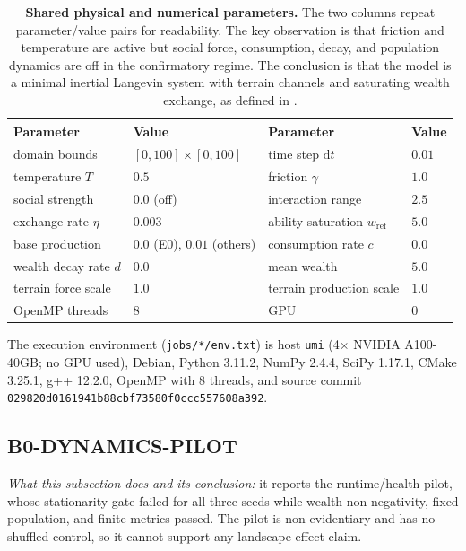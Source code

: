 \documentclass[11pt,a4paper]{article}
\newcommand{\code}[1]{\texttt{#1}}
\begin{document}
\begin{table}[htbp]
\centering
\small
\begin{tabular}{@{}llll@{}}
\toprule
\textbf{Parameter} & \textbf{Value} & \textbf{Parameter} & \textbf{Value} \\
\midrule
domain bounds & $[0,100]\times[0,100]$ & time step $\mathrm{d}t$ & $0.01$ \\
temperature $T$ & $0.5$ & friction $\gamma$ & $1.0$ \\
social strength & $0.0$ (off) & interaction range & $2.5$ \\
exchange rate $\eta$ & $0.003$ & ability saturation $w_{\mathrm{ref}}$ & $5.0$ \\
base production & $0.0$ (E0), $0.01$ (others) & consumption rate $c$ & $0.0$ \\
wealth decay rate $d$ & $0.0$ & mean wealth & $5.0$ \\
terrain force scale & $1.0$ & terrain production scale & $1.0$ \\
OpenMP threads & $8$ & GPU & $0$ \\
\bottomrule
\end{tabular}
\caption{\textbf{Shared physical and numerical parameters.} The two columns
repeat parameter/value pairs for readability. The key observation is that
friction and temperature are active but social force, consumption, decay, and
population dynamics are off in the confirmatory regime. The conclusion is that
the model is a minimal inertial Langevin system with terrain channels and
saturating wealth exchange, as defined in .}
\label{tab:params}
\end{table}

The execution environment (\code{jobs/*/env.txt}) is host \code{umi} (4$\times$
NVIDIA A100-40GB; no GPU used), Debian, Python 3.11.2, NumPy 2.4.4, SciPy
1.17.1, CMake 3.25.1, g++ 12.2.0, OpenMP with 8 threads, and source commit
\code{029820d0161941b88cbf73580f0ccc557608a392}.

\subsection{B0-DYNAMICS-PILOT}
\label{sec:b0}

\emph{What this subsection does and its conclusion:} it reports the
runtime/health pilot, whose stationarity gate failed for all three seeds while
wealth non-negativity, fixed population, and finite metrics passed. The pilot
is non-evidentiary and has no shuffled control, so it cannot support any
landscape-effect claim.
\end{document}
